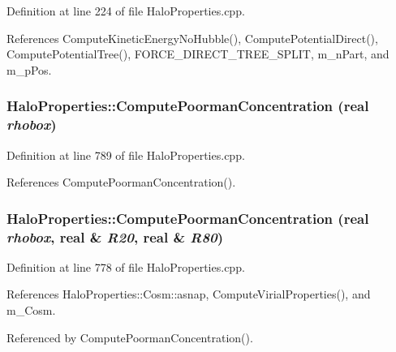 Definition at line 224 of file HaloProperties.cpp.



References ComputeKineticEnergyNoHubble(), ComputePotentialDirect(), ComputePotentialTree(), FORCE\_\-DIRECT\_\-TREE\_\-SPLIT, m\_\-nPart, and m\_\-pPos.

\subsubsection[{ComputePoormanConcentration}]{ HaloProperties::ComputePoormanConcentration ({\bf real} {\em rhobox})}\label{classHaloProperties_ac72e7d61cf10ee11b8f72af2bf32905a}


Definition at line 789 of file HaloProperties.cpp.



References ComputePoormanConcentration().

\subsubsection[{ComputePoormanConcentration}]{ HaloProperties::ComputePoormanConcentration ({\bf real} {\em rhobox}, \/  {\bf real} \& {\em R20}, \/  {\bf real} \& {\em R80})}\label{classHaloProperties_ac961040b7e402a1c1aca40f1968a3387}


Definition at line 778 of file HaloProperties.cpp.



References HaloProperties::Cosm::asnap, ComputeVirialProperties(), and m\_\-Cosm.



Referenced by ComputePoormanConcentration().


